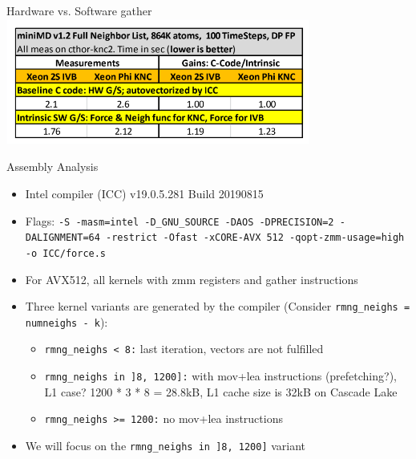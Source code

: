 \documentclass[aspectratio=169,t]{beamer}
\begin{document}
  \begin{frame}[fragile]{Hardware vs. Software gather}
  \centering
    \includegraphics[width=10cm]{minimd_hw_vs_sw_results_table.png}
  \end{frame}

  \begin{frame}[fragile]{Assembly Analysis}
    \begin{itemize}
      \item Intel compiler (ICC) v19.0.5.281 Build 20190815
      \item Flags: \texttt{-S -masm=intel -D\_GNU\_SOURCE -DAOS -DPRECISION=2 -DALIGNMENT=64 -restrict -Ofast -xCORE-AVX 512 -qopt-zmm-usage=high -o ICC/force.s}
      \item For AVX512, all kernels with zmm registers and gather instructions
      \item Three kernel variants are generated by the compiler (Consider \texttt{rmng\_neighs = numneighs - k}):
      \begin{itemize}
        \item \texttt{rmng\_neighs < 8:} last iteration, vectors are not fulfilled
        \item \texttt{rmng\_neighs in ]8, 1200]:} with mov+lea instructions (prefetching?), L1 case? 1200 * 3 * 8 = 28.8kB, L1 cache size is 32kB on Cascade Lake
        \item \texttt{rmng\_neighs >= 1200:} no mov+lea instructions
      \end{itemize}
      \item We will focus on the \texttt{rmng\_neighs in ]8, 1200]} variant
    \end{itemize}
  \end{frame}
\end{document}
